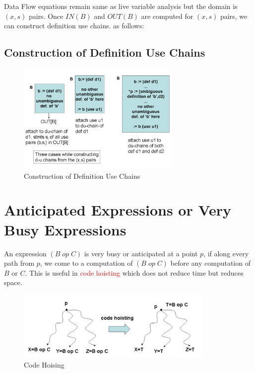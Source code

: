 \documentclass{article}
\begin{document}
Data Flow equations remain same as live variable analysis but the domain is $(x,s)$ pairs. Once $IN(B)$ and $OUT(B)$ are computed for $(x,s)$ pairs, we can construct definition use chains. as follows: \\

\subsection*{Construction of Definition Use Chains}

\begin{figure}[h]
    \centering
    \includegraphics[width=0.7\textwidth]{Images/duchain2.png}
    \caption{Construction of Definition Use Chains}
    \label{fig:DefUse}
\end{figure}

\section*{Anticipated Expressions or Very Busy Expressions}
An expression $(B \; op \; C)$ is very busy or anticipated at a point $p$, if along every path from $p$, we come to a computation of $(B \; op \; C)$ before any computation of $B$ or $C$. This is useful in \textcolor{red}{code hoisting} which does not reduce time but reduces space.

\begin{figure}[h]
    \centering
    \includegraphics[width=0.85\textwidth]{Images/hoisting.png}
    \caption{Code Hoising}
    \label{fig:AnticipatedExpressions}
\end{figure}
\end{document}
